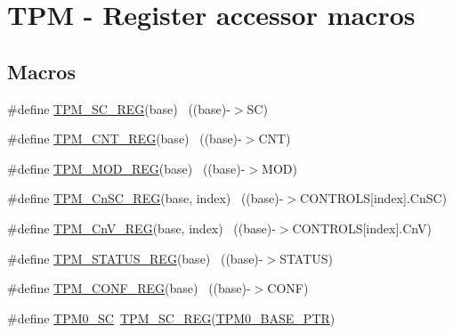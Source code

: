 \hypertarget{group___t_p_m___register___accessor___macros}{}\section{T\+PM -\/ Register accessor macros}
\label{group___t_p_m___register___accessor___macros}
\subsection*{Macros}
\begin{DoxyCompactItemize}
\item 
\#define \hyperlink{group___t_p_m___register___accessor___macros_ga28177fdb6d1afe4118a0f122775e6203}{T\+P\+M\+\_\+\+S\+C\+\_\+\+R\+EG}(base)                                              ~((base)-\/$>$SC)
\item 
\#define \hyperlink{group___t_p_m___register___accessor___macros_ga3530b221c9c2d64e2bf646fab601a7a8}{T\+P\+M\+\_\+\+C\+N\+T\+\_\+\+R\+EG}(base)                                            ~((base)-\/$>$C\+NT)
\item 
\#define \hyperlink{group___t_p_m___register___accessor___macros_gae62e8c6c02bc1521306f444fa4b3bc11}{T\+P\+M\+\_\+\+M\+O\+D\+\_\+\+R\+EG}(base)                                            ~((base)-\/$>$M\+OD)
\item 
\#define \hyperlink{group___t_p_m___register___accessor___macros_ga612e0c2a24983917789f2aed9f2da10f}{T\+P\+M\+\_\+\+Cn\+S\+C\+\_\+\+R\+EG}(base,  index)                              ~((base)-\/$>$C\+O\+N\+T\+R\+O\+LS\mbox{[}index\mbox{]}.Cn\+SC)
\item 
\#define \hyperlink{group___t_p_m___register___accessor___macros_ga50a6b115bed330d80e9ffe89ddcf316b}{T\+P\+M\+\_\+\+Cn\+V\+\_\+\+R\+EG}(base,  index)                                ~((base)-\/$>$C\+O\+N\+T\+R\+O\+LS\mbox{[}index\mbox{]}.CnV)
\item 
\#define \hyperlink{group___t_p_m___register___accessor___macros_gaf731998705df72f4d692a32b878ea308}{T\+P\+M\+\_\+\+S\+T\+A\+T\+U\+S\+\_\+\+R\+EG}(base)                                      ~((base)-\/$>$S\+T\+A\+T\+US)
\item 
\#define \hyperlink{group___t_p_m___register___accessor___macros_ga11b0f5d699a9fdd427880e0f47b2fe79}{T\+P\+M\+\_\+\+C\+O\+N\+F\+\_\+\+R\+EG}(base)                                          ~((base)-\/$>$C\+O\+NF)
\item 
\#define \hyperlink{group___t_p_m___register___accessor___macros_ga99b670f23bdc4dba03402182f90d62f1}{T\+P\+M0\+\_\+\+SC}~\hyperlink{group___t_p_m___register___accessor___macros_ga28177fdb6d1afe4118a0f122775e6203}{T\+P\+M\+\_\+\+S\+C\+\_\+\+R\+EG}(\hyperlink{group___t_p_m___peripheral_ga8ba6c6fb69345639750108c3289a24c4}{T\+P\+M0\+\_\+\+B\+A\+S\+E\+\_\+\+P\+TR})

\end{DoxyCompactItemize}
